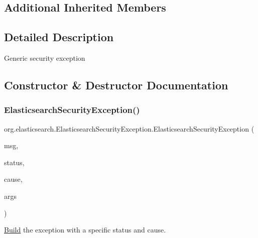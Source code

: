 \subsection*{Additional Inherited Members}


\subsection{Detailed Description}
Generic security exception 

\subsection{Constructor \& Destructor Documentation}
\hypertarget{classorg_1_1elasticsearch_1_1_elasticsearch_security_exception_a5f0e9afcfafaaaa5679204ae23c4d54d}{}\label{classorg_1_1elasticsearch_1_1_elasticsearch_security_exception_a5f0e9afcfafaaaa5679204ae23c4d54d} 
\subsubsection{\texorpdfstring{Elasticsearch\+Security\+Exception()}{ElasticsearchSecurityException()}\hspace{0.1cm}{\footnotesize\ttfamily [1/5]}}
{\footnotesize\ttfamily org.\+elasticsearch.\+Elasticsearch\+Security\+Exception.\+Elasticsearch\+Security\+Exception (\begin{DoxyParamCaption}\item[{String}]{msg,  }\item[{Rest\+Status}]{status,  }\item[{Throwable}]{cause,  }\item[{Object...}]{args }\end{DoxyParamCaption})}

\hyperlink{classorg_1_1elasticsearch_1_1_build}{Build} the exception with a specific status and cause. \hypertarget{classorg_1_1elasticsearch_1_1_elasticsearch_security_exception_aea6b2964cf3800b8213d147d5996f900}{}\label{classorg_1_1elasticsearch_1_1_elasticsearch_security_exception_aea6b2964cf3800b8213d147d5996f900} 
